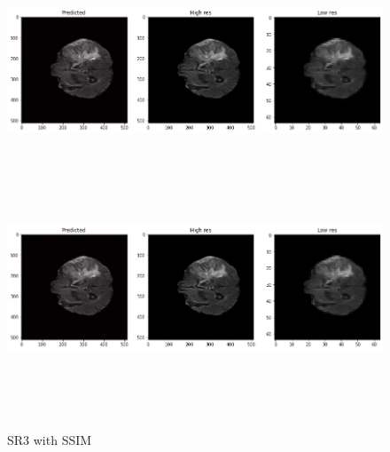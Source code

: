 \begin{figure}[!htbp]
  \begin{center}
    \leavevmode
    \ifpdf
      \includegraphics[height=2in]{Chapter4/images/spam2.png}
    \else
      \includegraphics[bb = 92 86 545 742, height=3in]{Chapter4/images/spam2.png}
    \fi
    \caption{SR3 with SSIM}
    \label{SR3 SSIM}
  \end{center}
\end{figure} 



